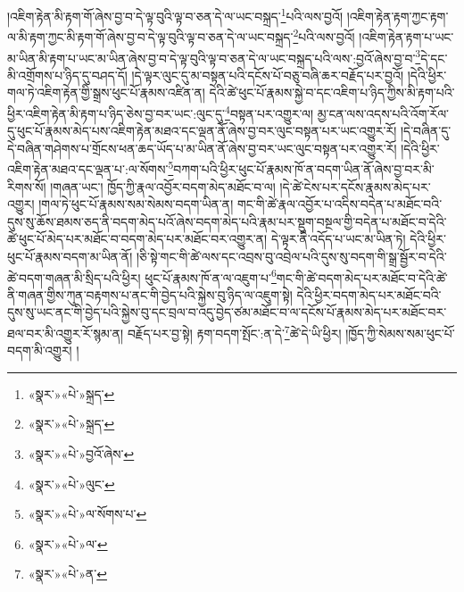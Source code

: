 །འཇིག་རྟེན་མི་རྟག་གོ་ཞེས་བྱ་བ་དེ་ལྟ་བུའི་ལྟ་བ་ཅན་དེ་ལ་ཡང་བསྐྲད་\footnote{«སྣར་»«པེ་»སྐྲད་}པའི་ལས་བྱའོ། །འཇིག་རྟེན་རྟག་ཀྱང་རྟག་ལ་མི་རྟག་ཀྱང་མི་རྟག་གོ་ཞེས་བྱ་བ་དེ་ལྟ་བུའི་ལྟ་བ་ཅན་དེ་ལ་ཡང་བསྐྲད་\footnote{«སྣར་»«པེ་»སྐྲད་}པའི་ལས་བྱའོ། །འཇིག་རྟེན་རྟག་པ་ཡང་མ་ཡིན་མི་རྟག་པ་ཡང་མ་ཡིན་ཞེས་བྱ་བ་དེ་ལྟ་བུའི་ལྟ་བ་ཅན་དེ་ལ་ཡང་བསྐྲད་པའི་ལས་:བྱའོ་ཞེས་བྱ་བ་\footnote{«སྣར་»«པེ་»བྱའོ་ཞེས་}དེ་དང་མི་འགྲོགས་པ་ཉིད་དུ་བཤད་དོ། །དེ་ལྟར་ལུང་དུ་མ་བསྟན་པའི་དངོས་པོ་བཅུ་བཞི་ཆར་བརྗོད་པར་བྱའོ། །དེའི་ཕྱིར་གལ་ཏེ་འཇིག་རྟེན་གྱི་སྒྲས་ཕུང་པོ་རྣམས་འཛིན་ན། དེའི་ཚེ་ཕུང་པོ་རྣམས་སྐྱེ་བ་དང་འཇིག་པ་ཉིད་ཀྱིས་མི་རྟག་པའི་ཕྱིར་འཇིག་རྟེན་མི་རྟག་པ་ཉིད་ཅེས་བྱ་བར་ཡང་:ལུང་དུ་\footnote{«སྣར་»«པེ་»ལུང་}བསྟན་པར་འགྱུར་ལ། མྱ་ངན་ལས་འདས་པའི་འོག་རོལ་དུ་ཕུང་པོ་རྣམས་མེད་པས་འཇིག་རྟེན་མཐའ་དང་ལྡན་ནོ་ཞེས་བྱ་བར་ལུང་བསྟན་པར་ཡང་འགྱུར་རོ། །དེ་བཞིན་དུ་དེ་བཞིན་གཤེགས་པ་གྲོངས་ཕན་ཆད་ཡོད་པ་མ་ཡིན་ནོ་ཞེས་བྱ་བར་ཡང་ལུང་བསྟན་པར་འགྱུར་རོ། །དེའི་ཕྱིར་འཇིག་རྟེན་མཐའ་དང་ལྡན་པ་:ལ་སོགས་\footnote{«སྣར་»«པེ་»ལ་སོགས་པ་}བཀག་པའི་ཕྱིར་ཕུང་པོ་རྣམས་ཁོ་ན་བདག་ཡིན་ནོ་ཞེས་བྱ་བར་མི་རིགས་སོ། །གཞན་ཡང་། ཁྱོད་ཀྱི་རྣལ་འབྱོར་བདག་མེད་མཐོང་བ་ལ། །དེ་ཚེ་ངེས་པར་དངོས་རྣམས་མེད་པར་འགྱུར། །གལ་ཏེ་ཕུང་པོ་རྣམས་སམ་སེམས་བདག་ཡིན་ན། གང་གི་ཚེ་རྣལ་འབྱོར་པ་འདིས་བདེན་པ་མཐོང་བའི་དུས་སུ་ཆོས་ཐམས་ཅད་ནི་བདག་མེད་པའོ་ཞེས་བདག་མེད་པའི་རྣམ་པར་སྡུག་བསྔལ་གྱི་བདེན་པ་མཐོང་བ་དེའི་ཚེ་ཕུང་པོ་མེད་པར་མཐོང་བ་བདག་མེད་པར་མཐོང་བར་འགྱུར་ན། དེ་ལྟར་ནི་འདོད་པ་ཡང་མ་ཡིན་ཏེ། དེའི་ཕྱིར་ཕུང་པོ་རྣམས་བདག་མ་ཡིན་ནོ། །ཅི་སྟེ་གང་གི་ཚེ་ལས་དང་འབྲས་བུ་འབྲེལ་པའི་དུས་སུ་བདག་གི་སྒྲ་སྦྱོར་བ་དེའི་ཚེ་བདག་གཞན་མི་སྲིད་པའི་ཕྱིར། ཕུང་པོ་རྣམས་ཁོ་ན་ལ་འཇུག་པ་\footnote{«སྣར་»«པེ་»ལ་}གང་གི་ཚེ་བདག་མེད་པར་མཐོང་བ་དེའི་ཚེ་ནི་གཞན་གྱིས་ཀུན་བརྟགས་པ་ནང་གི་བྱེད་པའི་སྐྱེས་བུ་ཉིད་ལ་འཇུག་སྟེ། དེའི་ཕྱིར་བདག་མེད་པར་མཐོང་བའི་དུས་སུ་ཡང་ནང་གི་བྱེད་པའི་སྐྱེས་བུ་དང་བྲལ་བ་འདུ་བྱེད་ཙམ་མཐོང་བ་ལ་དངོས་པོ་རྣམས་མེད་པར་མཐོང་བར་ཐལ་བར་མི་འགྱུར་རོ་སྙམ་ན། བརྗོད་པར་བྱ་སྟེ། རྟག་བདག་སྤོང་:ན་དེ་\footnote{«སྣར་»«པེ་»ན་}ཚེ་དེ་ཡི་ཕྱིར། །ཁྱོད་ཀྱི་སེམས་སམ་ཕུང་པོ་བདག་མི་འགྱུར། །
